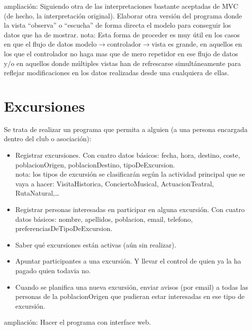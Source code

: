 \documentclass[spanish,12pt,a4paper,final,oneside]{book}
\begin{document}
ampliación: Siguiendo otra de las interpretaciones bastante aceptadas de MVC (de hecho, la interpretación original). Elaborar otra versión del programa donde la vista ``observa'' o ``escucha'' de forma directa el modelo para conseguir los datos que ha de mostrar. nota: Esta forma de proceder es muy útil en los casos en que el flujo de datos modelo$\rightarrow$controlador$\rightarrow$vista es grande, en aquellos en los que el controlador no haga mas que de mero repetidor en ese flujo de datos y/o en aquellos donde múltiples vistas han de refrescarse simultáneamente para reflejar modificaciones en los datos realizadas desde una cualquiera de ellas.


\section{Excursiones}\label{ejercicio_excursiones}

Se trata de realizar un programa que permita a alguien (a una persona encargada dentro del club o asociación):
\begin{itemize}

\item Registrar excursiones. Con cuatro datos básicos: fecha, hora, destino, coste, poblacionOrigen, poblacionDestino, tipoDeExcursion.
\\nota: los tipos de excursión se clasificarán según la actividad principal que se vaya a hacer: VisitaHistorica, ConciertoMusical, ActuacionTeatral, RutaNatural,\ldots 

\item Registrar personas interesadas en participar en alguna excursión. Con cuatro datos básicos: nombre, apellidos, poblacion, email, telefono, preferenciasDeTipoDeExcursion.

\item Saber qué excursiones están activas (aún sin realizar).

\item Apuntar participantes a una excursión. Y llevar el control de quien ya la ha pagado quien todavia no.

\item Cuando se planifica una nueva excursión, enviar avisos (por email) a todas las personas de la poblacionOrigen que pudieran estar interesadas en ese tipo de excursión.

\end{itemize}

ampliación: Hacer el programa con interface web.
\end{document}
